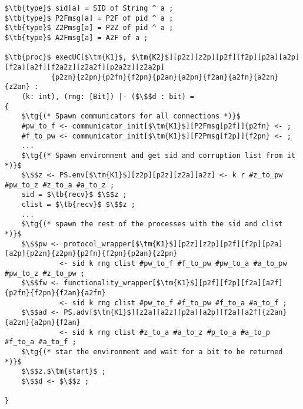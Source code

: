 \begin{lstlisting}[basicstyle=\small\BeraMonottFamily, frame=single,  mathescape]
$\tb{type}$ sid[a] = SID of String ^ a ;
$\tb{type}$ P2Fmsg[a] = P2F of pid ^ a ;
$\tb{type}$ Z2Pmsg[a] = P2Z of pid ^ a ;
$\tb{type}$ A2Fmsg[a] = A2F of a ;

$\tb{proc}$ execUC[$\tm{K1}$, $\tm{K2}$][p2z][z2p][p2f][f2p][p2a][a2p][f2a][a2f][f2a2z][z2a2f][p2a2z][z2a2p]
           {p2zn}{z2pn}{p2fn}{f2pn}{p2an}{a2pn}{f2an}{a2fn}{a2zn}{z2an} : 
    (k: int), (rng: [Bit]) |- ($\$$d : bit) = 
{
    $\tg{(* Spawn communicators for all connections *)}$
    #pw_to_f <- communicator_init[$\tm{K1}$][P2Fmsg[p2f]]{p2fn} <- ;
    #f_to_pw <- communicator_init[$\tm{K1}$][F2Pmsg[f2p]]{f2pn} <- ;
    ...
    $\tg{(* Spawn environment and get sid and corruption list from it *)}$
    $\$$z <- PS.env[$\tm{K1}$][z2p][p2z][z2a][a2z] <- k r #z_to_pw #pw_to_z #z_to_a #a_to_z ;
    sid = $\tb{recv}$ $\$$z ;
    clist = $\tb{recv}$ $\$$z ;
    ...
    $\tg{(* spawn the rest of the processes with the sid and clist *)}$
    $\$$pw <- protocol_wrapper[$\tm{K1}$][p2z][z2p][p2f][f2p][p2a][a2p]{p2zn}{z2pn}{p2fn}{f2pn}{p2an}{z2pn} 
             <- sid k rng clist #pw_to_f #f_to_pw #pw_to_a #a_to_pw #pw_to_z #z_to_pw ;
    $\$$fw <- functionality_wrapper[$\tm{K1}$][p2f][f2p][f2a][a2f] {p2fn}{f2pn}{f2an}{a2fn}
             <- sid k rng clist #pw_to_f #f_to_pw #f_to_a #a_to_f ;
    $\$$ad <- PS.adv[$\tm{K1}$][z2a][a2z][p2a][a2p][f2a][a2f]{z2an}{a2zn}{a2pn}{f2an}
             <- sid k rng clist #z_to_a #a_to_z #p_to_a #a_to_p #f_to_a #a_to_f ;
    $\tg{(* star the environment and wait for a bit to be returned *)}$
    $\$$z.$\tm{start}$ ;
    $\$$d <- $\$$z ;

}
\end{lstlisting}
